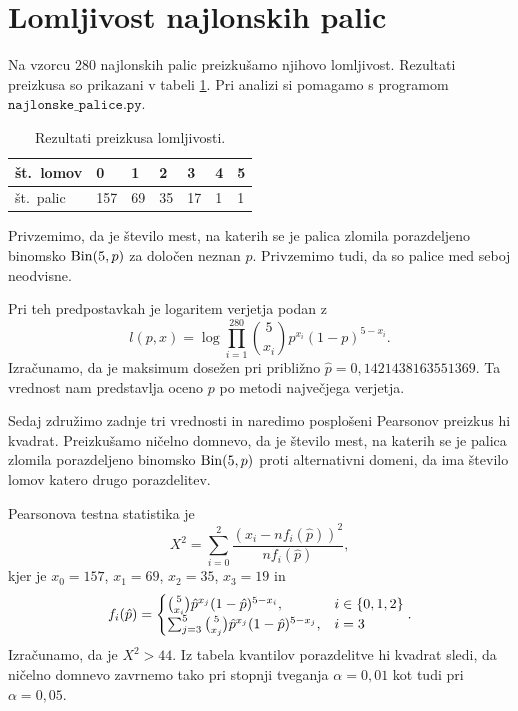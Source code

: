 \documentclass[12pt, a4paper]{article}
\begin{document}
\section{Lomljivost najlonskih palic}
Na vzorcu $280$ najlonskih palic preizkušamo njihovo lomljivost. Rezultati 
preizkusa so prikazani v tabeli \ref{table:lomljivost}. Pri analizi 
si pomagamo s programom $\texttt{najlonske\_palice.py}$.
\begin{table}[H]
    \centering
    \begin{tabular}{|l||l|l|l|l|l|l|}
        \hline
        št.~lomov & 0   & 1  & 2  & 3  & 4 & 5 \\ \hline
        št.~palic & 157 & 69 & 35 & 17 & 1 & 1 \\ \hline
    \end{tabular}
    \caption{Rezultati preizkusa lomljivosti.}
    \label{table:lomljivost}
\end{table}
Privzemimo, da je število mest, na katerih se je palica 
zlomila porazdeljeno binomsko $\operatorname{Bin}(5, p)$ za določen neznan $p$.
Privzemimo tudi, da so palice med seboj neodvisne.


Pri teh predpostavkah je logaritem verjetja podan z
\[
    l(p, x) = \log\prod_{i=1}^{280} \binom{5}{x_i}p^{x_i}(1-p)^{5-x_i}.
\]
Izračunamo, da je maksimum 
dosežen pri približno $\hat p = 0{,}1421438163551369$. Ta vrednost
nam predstavlja oceno $p$ po metodi največjega verjetja.


Sedaj združimo zadnje tri vrednosti in naredimo posplošeni 
Pearsonov preizkus hi kvadrat. Preizkušamo ničelno domnevo, da 
je število mest, na katerih se je palica zlomila porazdeljeno 
binomsko $\operatorname{Bin}(5, p)$ proti alternativni domeni, da ima število 
lomov katero drugo porazdelitev.

Pearsonova testna statistika je
\[
    X^2 = \sum_{i=0}^{2}\frac{(x_i - nf_i(\hat p))^2}{nf_i(\hat p)},
\]
kjer je $x_0 = 157$, $x_1 = 69$, $x_2 = 35$, $x_3 = 19$ in
\[
    f_i(\hat p) = \begin{cases}
        \binom{5}{x_i}\hat p^{x_j}(1-\hat p)^{5-x_i}, &i \in \left\{0,1,2\right\} \\
        \sum_{j=3}^{5} \binom{5}{x_j}\hat p^{x_j}(1-\hat p)^{5-x_j}, &i = 3 
    \end{cases}.
\]
Izračunamo, da je $X^2 > 44$. Iz tabela kvantilov porazdelitve 
hi kvadrat sledi, da ničelno domnevo zavrnemo tako 
pri stopnji tveganja $\alpha = 0{,}01$ kot tudi pri $\alpha = 0{,}05$. 
\end{document}
